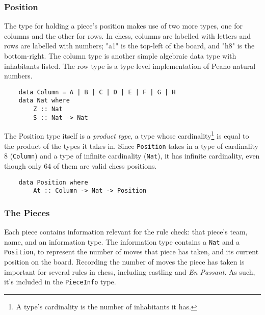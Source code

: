 \documentclass[12pt, a4paper]{scrartcl}
\begin{document}
\subsubsection{Position}

The type for holding a piece's position makes use of two more types, one for columns and the other for rows. In chess, columns are labelled with letters and rows are labelled with numbers; "a1" is the top-left of the board, and "h8" is the bottom-right. The column type is another simple algebraic data type with inhabitants listed. The row type is a type-level implementation of Peano natural numbers.


\begin{lstlisting}
    data Column = A | B | C | D | E | F | G | H
    data Nat where
        Z :: Nat
        S :: Nat -> Nat
\end{lstlisting}

The Position type itself is a \emph{product type}, a type whose cardinality\footnote{A type's cardinality is the number of inhabitants it has.} is equal to the product of the types it takes in. Since \lstinline{Position} takes in a type of cardinality 8 (\lstinline{Column}) and a type of infinite cardinality (\lstinline{Nat}), it has infinite cardinality, even though only 64 of them are valid chess positions.


\begin{lstlisting}
    data Position where
        At :: Column -> Nat -> Position
\end{lstlisting}

\subsubsection{The Pieces}

Each piece contains information relevant for the rule check: that piece's team, name, and an information type. The information type contains a \lstinline{Nat} and a \lstinline{Position}, to represent the number of moves that piece has taken, and its current position on the board. Recording the number of moves the piece has taken is important for several rules in chess, including castling and \textit{En Passant}. As such, it's included in the \lstinline{PieceInfo} type.
\end{document}
